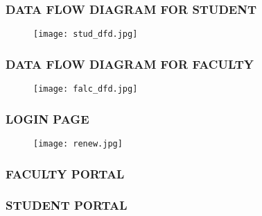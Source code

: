 \documentclass{beamer}
\begin{document}
\begin{frame}
  \frametitle{DATA FLOW DIAGRAM FOR STUDENT}
  \begin{figure}
    \centering
    \texttt{[image: stud\_dfd.jpg]} 
  \end{figure}
\end{frame}

\begin{frame}
   \frametitle{DATA FLOW DIAGRAM FOR FACULTY}
   \begin{figure}
      \centering
      \texttt{[image: falc\_dfd.jpg]}
    \end{figure}
\end{frame}   

\begin{frame}
  \frametitle{LOGIN PAGE}
  \begin{figure}
    \centering
    \texttt{[image: renew.jpg]}
  \end{figure}
\end{frame}

\begin{frame}
  \frametitle{FACULTY PORTAL}

\end{frame}

\begin{frame}
  \frametitle{STUDENT PORTAL}
 \begin{center} 
  \end{center}
\end{frame}
\end{document}

